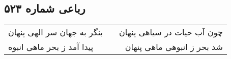 \begin{center}
\section*{رباعی شماره ۵۲۳}
\label{sec:sh523}
\begin{longtable}{l p{0.5cm} r}
بنگر به جهان سر الهی پنهان
&&
چون آب حیات در سیاهی پنهان
\\
پیدا آمد ز بحر ماهی انبوه
&&
شد بحر ز انبوهی ماهی پنهان
\\
\end{longtable}
\end{center}
